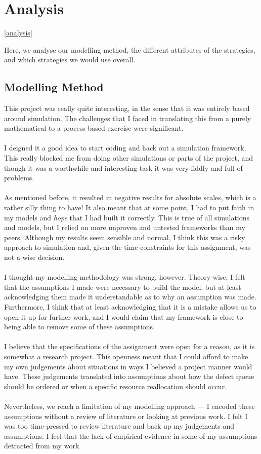 \section{Analysis} \ref{analysis}

Here, we analyse our modelling method, the different attributes of the strategies, and which
strategies we would use overall.

\subsection{Modelling Method}

This project was really quite interesting, in the sense that it was entirely based around
simulation.
The challenges that I faced in translating this from a purely mathematical to a process-based
exercise were significant.\\
\\
I deigned it a good idea to start coding and hack out a simulation framework.
This really blocked me from doing other simulations or parts of the project, and though it was a
worthwhile and interesting task it was very fiddly and full of problems.\\
\\
As mentioned before, it resulted in negative results for absolute scales, which is a rather silly
thing to have!
It also meant that at some point, I had to put faith in my models and {\em hope} that I had built it
correctly.
This is true of all simulations and models, but I relied on more unproven and untested frameworks
than my peers.
Although my results seem sensible and normal, I think this was a risky approach to simulation and,
given the time constraints for this assignment, was not a wise decision.\\
\\
I thought my modelling methodology was strong, however.
Theory-wise, I felt that the assumptions I made were necessary to build the model, but at least
acknowledging them made it understandable as to why an assumption was made.
Furthermore, I think that at least acknowledging that it is a mistake allows us to open it up for
further work, and I would claim that my framework is close to being able to remove some of these
assumptions.\\
\\
I believe that the specifications of the assignment were open for a reason, as it is somewhat a
research project.
This openness meant that I could afford to make my own judgements about situations in ways I
believed a project manner would have.
These judgements translated into assumptions about how the defect queue should be ordered or when a
specific resource reallocation should occur.\\
\\
Nevertheless, we reach a limitation of my modelling approach --- I encoded these assumptions without
a review of literature or looking at previous work.
I felt I was too time-pressed to review literature and back up my judgements and assumptions.
I feel that the lack of empirical evidence in some of my assumptions detracted from my work.

